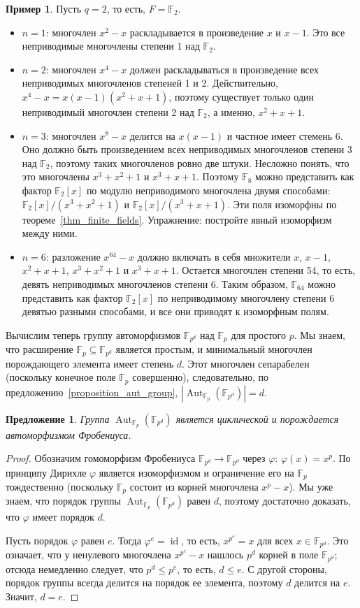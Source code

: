\documentclass[a4paper,11pt]{scrartcl}
\theoremstyle{plain}
\newtheorem{proposition}[theorem]{Предложение}
\theoremstyle{definition}
\newtheorem{example}[theorem]{Пример}
\newcommand\mb{\mathbb}
\newcommand\ph{\varphi}
\newcommand\sseq{\subseteq}
\newcommand\id{\operatorname{id}}
\newcommand\Aut{\operatorname{Aut}}
\begin{document}
\begin{example}
Пусть $q=2$, то есть, $F=\mb F_2$.
\begin{itemize}
\item $n=1$: многочлен $x^2-x$ раскладывается в произведение $x$ и
  $x-1$. Это все неприводимые многочлены степени 1 над $\mb F_2$.
\item $n=2$: многочлен $x^4-x$ должен раскладываться в произведение
  всех неприводимых многочленов степеней 1 и 2. Действительно,
  $x^4-x=x(x-1)(x^2+x+1)$, поэтому существует только один неприводимый
  многочлен степени 2 над $\mb F_2$, а именно, $x^2+x+1$.
\item $n=3$: многочлен $x^8-x$ делится на $x(x-1)$ и частное имеет
  стемень 6. Оно должно быть произведением всех неприводимых
  многочленов степени 3 над $\mb F_2$, поэтому таких многочленов ровно
  две штуки. Несложно понять, что это многочлены $x^3+x^2+1$ и
  $x^3+x+1$. Поэтому $\mb F_8$ можно представить как фактор $\mb
  F_2[x]$ по модулю неприводимого многочлена двумя способами: 
  $\mb F_2[x]/(x^3+x^2+1)$ и $\mb F_2[x]/(x^3+x+1)$. Эти поля
  изоморфны по теореме~\ref{thm_finite_fields}. Упражнение: постройте
  явный изоморфизм между ними.
\item $n=6$: разложение $x^{64}-x$ должно включать в себя множители
  $x$, $x-1$, $x^2+x+1$, $x^3+x^2+1$ и $x^3+x+1$. Остается многочлен
  степени 54, то есть, девять неприводимых многочленов степени
  6. Таким образом, $\mb F_{64}$ можно представить как фактор $\mb
  F_2[x]$ по неприводимому многочлену степени 6 девятью разными
  способами, и все они приводят к изоморфным полям.
\end{itemize}
\end{example}

Вычислим теперь группу автоморфизмов $\mb F_{p^d}$ над $\mb F_p$ для
простого $p$. Мы знаем, что расширение $\mb F_p\sseq\mb F_{p^d}$
является простым, и минимальный многочлен порождающего элемента имеет
степень $d$. Этот многочлен сепарабелен (поскольку конечное поле $\mb
F_p$ совершенно), следовательно, по
предложению~\ref{proposition_aut_group}, $|\Aut_{\mb F_p}(\mb
F_{p^d})|=d$.

\begin{proposition}
Группа $\Aut_{\mb F_p}(\mb F_{p^d})$ является циклической и
порождается автоморфизмом Фробениуса.
\end{proposition}
\begin{proof}
Обозначим гомоморфизм Фробениуса $\mb F_{p^d}\to\mb F_{p^d}$ через
$\ph$: $\ph(x)=x^p$. По принципу Дирихле $\ph$ является изоморфизмом и
ограничение его на $\mb F_p$ тождественно (поскольку $\mb F_p$ состоит
из корней многочлена $x^p-x$). Мы уже знаем, что порядок группы
$\Aut_{\mb F_p}(\mb F_{p^d})$ равен $d$, поэтому достаточно доказать,
что $\ph$ имеет порядок $d$.

Пусть порядок $\ph$ равен $e$. Тогда $\ph^e=\id$, то есть, $x^{p^e}=x$
для всех $x\in\mb F_{p^d}$. Это означает, что у ненулевого многочлена
$x^{p^e}-x$ нашлось $p^d$ корней в поле $\mb F_{p^d}$; отсюда
немедленно следует, что $p^d\leq p^e$, то есть, $d\leq e$. С другой
стороны, порядок группы всегда делится на порядок ее элемента, поэтому
$d$ делится на $e$. Значит, $d=e$.
\end{proof}
\end{document}
